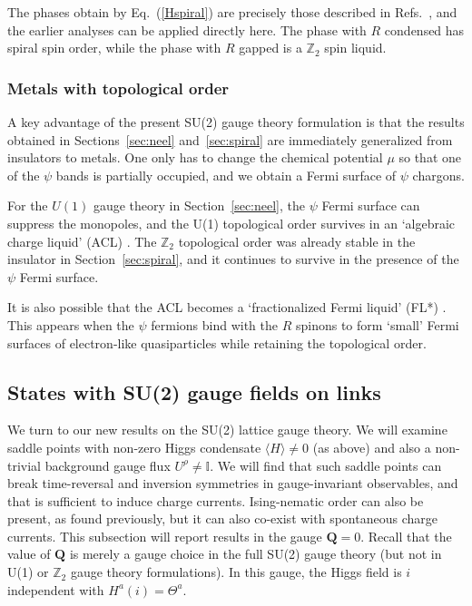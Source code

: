 \documentclass[aps,prb,preprint,onecolumn,citeautoscript,superscriptaddress,footinbib,
eqsecnum]{revtex4-1}
\begin{document}
The phases obtain by Eq.~(\ref{Hspiral}) are precisely those described in Refs.~, 
and the earlier
analyses can be applied directly here. The phase with $R$ condensed has spiral spin order, while the phase with $R$ gapped
is a $\mathbb{Z}_2$ spin liquid. 

\subsubsection{Metals with topological order}
\label{sec:metaltopo}

A key advantage of the present SU(2) gauge theory formulation is that the results obtained in Sections~\ref{sec:neel}
and~\ref{sec:spiral} are immediately generalized from insulators to metals. One only has to change the chemical potential $\mu$
so that one of the $\psi$ bands is partially occupied, and we obtain a Fermi surface of $\psi$ chargons. 

For the $U(1)$ gauge theory in Section~\ref{sec:neel}, the $\psi$ Fermi surface can suppress the monopoles, and 
the U(1) topological order survives in an `algebraic charge liquid' (ACL) \cite{2008NatPh...4...28K}. The $\mathbb{Z}_2$ topological order
was already stable in the insulator in Section~\ref{sec:spiral}, and it continues to survive in the presence of the $\psi$ 
Fermi surface.

It is also possible that the ACL becomes a `fractionalized Fermi liquid' (FL*) \cite{FFL,TSMVSS04,APAV04}. 
This appears when the $\psi$ fermions
bind with the $R$ spinons to form `small' Fermi surfaces of 
electron-like quasiparticles \cite{2007PhRvB..75w5122K,2008NatPh...4...28K,2012PhRvB..85s5123P,2015PNAS..112.9552P} while retaining the topological order.

\subsection{States with SU(2) gauge fields on links}
\label{sec:loop}

We turn to our new results on the SU(2) lattice gauge theory. We will examine saddle points with 
non-zero Higgs condensate $\langle H \rangle \neq 0$ (as above) and also a non-trivial background gauge flux
$U^\rho \neq \mathbb{I}$.
We will find that such saddle points can break time-reversal and inversion symmetries in gauge-invariant observables,
and that is sufficient to induce charge currents. 
Ising-nematic order can also be present, as found previously, but it
can also co-exist with spontaneous charge currents. This subsection will report results in the
gauge ${\bm Q} = 0$. Recall that the value of ${\bm Q}$ is merely a gauge choice in the full SU(2) gauge theory (but not in U(1) or $\mathbb{Z}_2$ gauge theory formulations).
In this gauge, the Higgs field is $i$ independent 
with $H^a (i) = \Theta^a$.
\end{document}
